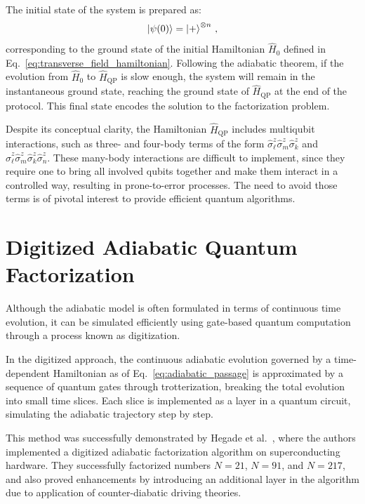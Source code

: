 The initial state of the system is prepared as:
\begin{equation}
	\ket{\psi(0)} = \ket{+}^{\otimes n}\,,
	\label{eq:initial_state}
\end{equation}
corresponding to the ground state of the initial Hamiltonian $\hat{H}_0$ defined in Eq.~\eqref{eq:transverse_field_hamiltonian}.
Following the adiabatic theorem, if the evolution from $\hat{H}_0$ to $\hat{H}_\mathrm{QP}$ is slow enough, the system will remain in the instantaneous ground state, reaching the ground state of $\hat{H}_\mathrm{QP}$ at the end of the protocol. This final state encodes the solution to the factorization problem.

Despite its conceptual clarity, the Hamiltonian $\hat{H}_\mathrm{QP}$ includes multiqubit interactions, such as three- and four-body terms of the form $\hat{\sigma}_\ell^z \hat{\sigma}_m^z \hat{\sigma}_k^z$ and $\hat{\sigma}_\ell^z \hat{\sigma}_m^z \hat{\sigma}_k^z \hat{\sigma}_n^z$. These many-body interactions are difficult to implement, since they require one to bring all involved qubits together and make them interact in a controlled way, resulting in prone-to-error processes. The need to avoid those terms is of pivotal interest to provide efficient quantum algorithms.

\section{Digitized Adiabatic Quantum Factorization}
Although the adiabatic model is often formulated in terms of continuous time evolution, it can be simulated efficiently using gate-based quantum computation through a process known as digitization.

In the digitized approach, the continuous adiabatic evolution governed by a time-dependent Hamiltonian as of Eq.~\eqref{eq:adiabatic_passage} is approximated by a sequence of quantum gates through trotterization, breaking the total evolution into small time slices. Each slice is implemented as a layer in a quantum circuit, simulating the adiabatic trajectory step by step.

This method was successfully demonstrated by Hegade et al.~\cite{hegade_digitized_2021}, where the authors implemented a digitized adiabatic factorization algorithm on superconducting hardware. They successfully factorized numbers $N=21$, $N=91$, and $N=217$, and also proved enhancements by introducing an additional layer in the algorithm due to application of counter-diabatic driving theories.

